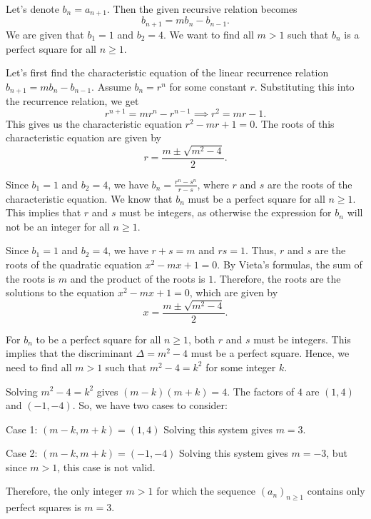 Let's denote $b_n = a_{n+1}$. Then the given recursive relation becomes
$$b_{n+1} = mb_n - b_{n-1}.$$
We are given that $b_1 = 1$ and $b_2 = 4$. We want to find all $m > 1$ such that $b_n$ is a perfect square for all $n \geq 1$.

Let's first find the characteristic equation of the linear recurrence relation $b_{n+1} = mb_n - b_{n-1}$. Assume $b_n = r^n$ for some constant $r$. Substituting this into the recurrence relation, we get
$$r^{n+1} = mr^n - r^{n-1} \implies r^2 = mr - 1.$$
This gives us the characteristic equation $r^2 - mr + 1 = 0$. The roots of this characteristic equation are given by
$$r = \frac{m \pm \sqrt{m^2 - 4}}{2}.$$

Since $b_1 = 1$ and $b_2 = 4$, we have $b_n = \frac{r^n - s^n}{r - s}$, where $r$ and $s$ are the roots of the characteristic equation. We know that $b_n$ must be a perfect square for all $n \geq 1$. This implies that $r$ and $s$ must be integers, as otherwise the expression for $b_n$ will not be an integer for all $n \geq 1$.

Since $b_1 = 1$ and $b_2 = 4$, we have $r + s = m$ and $rs = 1$. Thus, $r$ and $s$ are the roots of the quadratic equation $x^2 - mx + 1 = 0$. By Vieta's formulas, the sum of the roots is $m$ and the product of the roots is $1$. Therefore, the roots are the solutions to the equation $x^2 - mx + 1 = 0$, which are given by
$$x = \frac{m \pm \sqrt{m^2 - 4}}{2}.$$

For $b_n$ to be a perfect square for all $n \geq 1$, both $r$ and $s$ must be integers. This implies that the discriminant $\Delta = m^2 - 4$ must be a perfect square. Hence, we need to find all $m > 1$ such that $m^2 - 4 = k^2$ for some integer $k$.

Solving $m^2 - 4 = k^2$ gives $(m-k)(m+k) = 4$. The factors of $4$ are $(1,4)$ and $(-1,-4)$. So, we have two cases to consider:

Case 1: $(m-k,m+k) = (1,4)$
Solving this system gives $m = 3$.

Case 2: $(m-k,m+k) = (-1,-4)$
Solving this system gives $m = -3$, but since $m > 1$, this case is not valid.

Therefore, the only integer $m > 1$ for which the sequence $(a_n)_{n\ge1}$ contains only perfect squares is $m = 3$.
